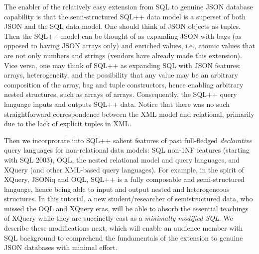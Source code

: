 The enabler of the relatively easy extension from SQL to genuine JSON database capability is that the semi-structured SQL++ data model is a superset of both JSON and the SQL data model. One should think of JSON objects as tuples. Then the SQL++ model can be thought of as expanding JSON with bags (as opposed to having JSON arrays only) and enriched values, i.e., atomic values that are not only numbers and strings (vendors have already made this extension).
Vice versa, one may think of SQL++ as expanding SQL with JSON features: arrays, heterogeneity, and the possibility that any value may be an arbitrary composition of the array, bag and tuple constructors, hence enabling arbitrary nested structures, such as arrays of arrays. Consequently, the SQL++ query language inputs and outputs SQL++ data. Notice that there was no such straightforward correspondence between the XML model and relational, primarily due to the lack of explicit tuples in XML.

Then we incorprorate into SQL++ salient features of past full-fledged \textit{declarative} query languages for non-relational data models: SQL non-1NF features (starting with SQL 2003), OQL,
the nested relational model and query languages,
and XQuery (and other XML-based query languages).
For example, in the spirit of XQuery, JSONiq and OQL, SQL++ is a fully composable and semi-structured language, hence being able to input and output nested and heterogeneous structures. In this tutorial, a new student/researcher of semistructured data, who missed the OQL and XQuery eras, will be able to absorb the essential teachings of XQuery while they are succinctly cast as a {\em minimally modified SQL}. We describe these modifications next, which will enable an audience member with SQL background to comprehend the fundamentals of the extension to genuine JSON databases with minimal effort.

